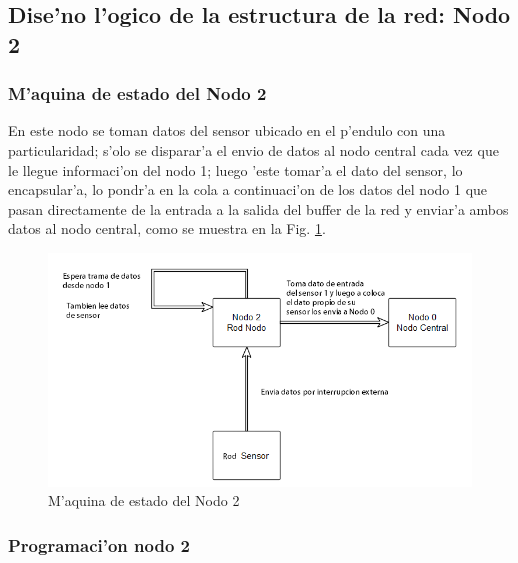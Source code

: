 \subsection{Dise'no l'ogico de la estructura de la red: Nodo 2}

\subsubsection{M'aquina de estado del Nodo 2}
En este nodo se toman datos del sensor ubicado en el p'endulo con una particularidad; s'olo se disparar'a el envio de datos al nodo central cada vez que le llegue informaci'on del nodo 1; luego 'este tomar'a el dato del sensor, lo encapsular'a, lo pondr'a en la cola a continuaci'on de los datos del nodo 1 que pasan directamente de la entrada a la salida del buffer de la red y enviar'a ambos datos al nodo central, como se muestra en la Fig. \ref{fig:nodo2}.


\begin{figure}[ht]
	\centering
		\includegraphics[scale=0.6]{nodo2}
	\caption{M'aquina de estado del Nodo 2}
	\label{fig:nodo2}
\end{figure}

\subsubsection{Programaci'on nodo 2}


